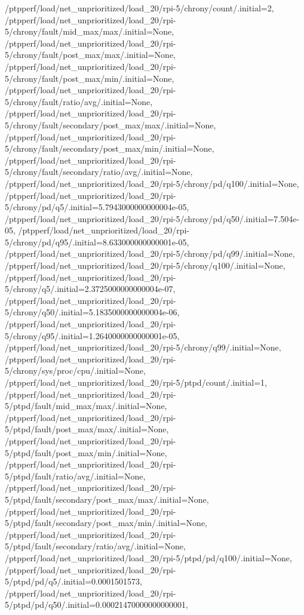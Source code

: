 {    /ptpperf/load/net_unprioritized/load_20/rpi-5/chrony/count/.initial=2,
    /ptpperf/load/net_unprioritized/load_20/rpi-5/chrony/fault/mid_max/max/.initial=None,
    /ptpperf/load/net_unprioritized/load_20/rpi-5/chrony/fault/post_max/max/.initial=None,
    /ptpperf/load/net_unprioritized/load_20/rpi-5/chrony/fault/post_max/min/.initial=None,
    /ptpperf/load/net_unprioritized/load_20/rpi-5/chrony/fault/ratio/avg/.initial=None,
    /ptpperf/load/net_unprioritized/load_20/rpi-5/chrony/fault/secondary/post_max/max/.initial=None,
    /ptpperf/load/net_unprioritized/load_20/rpi-5/chrony/fault/secondary/post_max/min/.initial=None,
    /ptpperf/load/net_unprioritized/load_20/rpi-5/chrony/fault/secondary/ratio/avg/.initial=None,
    /ptpperf/load/net_unprioritized/load_20/rpi-5/chrony/pd/q100/.initial=None,
    /ptpperf/load/net_unprioritized/load_20/rpi-5/chrony/pd/q5/.initial=5.7943000000000004e-05,
    /ptpperf/load/net_unprioritized/load_20/rpi-5/chrony/pd/q50/.initial=7.504e-05,
    /ptpperf/load/net_unprioritized/load_20/rpi-5/chrony/pd/q95/.initial=8.633000000000001e-05,
    /ptpperf/load/net_unprioritized/load_20/rpi-5/chrony/pd/q99/.initial=None,
    /ptpperf/load/net_unprioritized/load_20/rpi-5/chrony/q100/.initial=None,
    /ptpperf/load/net_unprioritized/load_20/rpi-5/chrony/q5/.initial=2.3725000000000004e-07,
    /ptpperf/load/net_unprioritized/load_20/rpi-5/chrony/q50/.initial=5.1835000000000004e-06,
    /ptpperf/load/net_unprioritized/load_20/rpi-5/chrony/q95/.initial=1.2640000000000001e-05,
    /ptpperf/load/net_unprioritized/load_20/rpi-5/chrony/q99/.initial=None,
    /ptpperf/load/net_unprioritized/load_20/rpi-5/chrony/sys/proc/cpu/.initial=None,
    /ptpperf/load/net_unprioritized/load_20/rpi-5/ptpd/count/.initial=1,
    /ptpperf/load/net_unprioritized/load_20/rpi-5/ptpd/fault/mid_max/max/.initial=None,
    /ptpperf/load/net_unprioritized/load_20/rpi-5/ptpd/fault/post_max/max/.initial=None,
    /ptpperf/load/net_unprioritized/load_20/rpi-5/ptpd/fault/post_max/min/.initial=None,
    /ptpperf/load/net_unprioritized/load_20/rpi-5/ptpd/fault/ratio/avg/.initial=None,
    /ptpperf/load/net_unprioritized/load_20/rpi-5/ptpd/fault/secondary/post_max/max/.initial=None,
    /ptpperf/load/net_unprioritized/load_20/rpi-5/ptpd/fault/secondary/post_max/min/.initial=None,
    /ptpperf/load/net_unprioritized/load_20/rpi-5/ptpd/fault/secondary/ratio/avg/.initial=None,
    /ptpperf/load/net_unprioritized/load_20/rpi-5/ptpd/pd/q100/.initial=None,
    /ptpperf/load/net_unprioritized/load_20/rpi-5/ptpd/pd/q5/.initial=0.0001501573,
    /ptpperf/load/net_unprioritized/load_20/rpi-5/ptpd/pd/q50/.initial=0.00021470000000000001,
}
